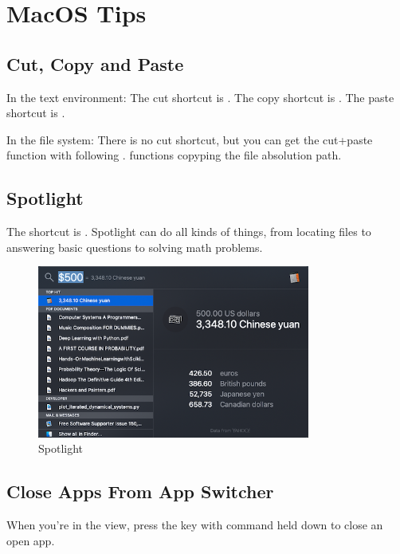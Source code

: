 
\chapter{MacOS Tips}


\section{Cut, Copy and Paste}
In the text environment:
The cut shortcut is .
The copy shortcut is .
The paste shortcut is .

In the file system:
There is no cut shortcut, but you can get the cut+paste function with  following .
 functions copyping the file absolution path.



\section{Spotlight}

The shortcut is . Spotlight can do all kinds of things, from locating files to answering basic questions to solving math problems.

\begin{figure}[H]
  \centering
  \includegraphics[width=0.8\textwidth]{spotlight.png}
  \caption{Spotlight}
\end{figure}

\section{Close Apps From App Switcher}

When you're in the  view, press the  key with command held down to close an open app.


